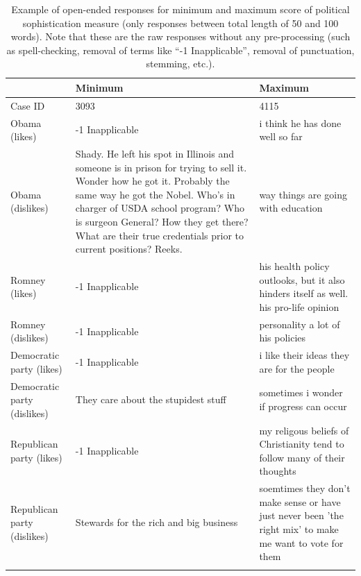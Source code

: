 \documentclass[12pt]{article}
\begin{document}
\newpage
\begin{longtable}[ht]{p{4cm}p{6cm}p{6cm}}
   \hline
  & Minimum & Maximum \\ 
   \hline
 Case ID & 3093 & 4115 \\ 
   Obama (likes) & -1 Inapplicable & i think he has done well so far \\ 
   Obama (dislikes) & Shady. He left his spot in Illinois and someone is in prison for trying to sell it. Wonder how he got it. Probably the same way he got the Nobel. Who's in charger of USDA school program? Who is surgeon General? How they get there? What are their true credentials prior to current positions? Reeks. & way things are going with education \\ 
   Romney (likes) & -1 Inapplicable & his health policy outlooks, but it also hinders itself as well. his pro-life opinion \\ 
   Romney (dislikes) & -1 Inapplicable & personality a lot of his policies \\ 
   Democratic party (likes) & -1 Inapplicable & i like their ideas they are for the people \\ 
   Democratic party (dislikes) & They care about the stupidest stuff & sometimes i wonder if progress can occur \\ 
   Republican party (likes) & -1 Inapplicable & my religous beliefs of Christianity tend to follow many of their thoughts \\ 
   Republican party (dislikes) & Stewards for the rich and big business & soemtimes they don't make sense or have just never been 'the right mix' to make me want to vote for them \\ 
    \hline
  \caption{Example of open-ended responses for minimum and maximum score of political sophistication measure (only responses between total length of 50 and 100 words). Note that these are the raw responses without any pre-processing (such as spell-checking, removal of terms like ``-1 Inapplicable'', removal of punctuation, stemming, etc.).}
  \label{tab:ex1}
\end{longtable}
\end{document}
